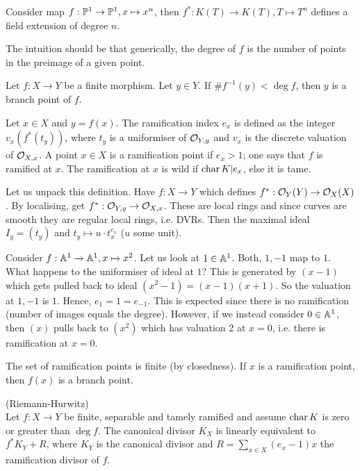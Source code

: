 \documentclass[a4paper,11pt]{article}
\begin{document}
			\begin{eg}
				Consider map $f:\P^1\rightarrow\P^1, x\mapsto x^n$, then $f^\ast:K(T)\rightarrow K(T),T\mapsto T^n$ defines a field extension of degree $n$. 
			\end{eg}

			The intuition should be that generically, the degree of $f$ is the number of points in the preimage of a given point. 

			\begin{defi}
				Let $f:X\rightarrow Y$ be a finite morphism. Let $y\in Y$. If $\#f^{-1}(y)<\deg f$, then $y$ is a branch point of $f$.
			\end{defi}

			\begin{defi}
				Let $x\in X$ and $y=f(x)$. The ramification index $e_x$ is defined as the integer $v_x(f^\ast(t_y))$, where $t_y$ is a uniformiser of $\O_{Y,y}$ and $v_x$ is the discrete valuation of $\O_{X,x}$. A point $x\in X$ is a ramification point if $e_x>1$; one says that $f$ is ramified at $x$. The ramification at $x$ is wild if $\Char K|e_x$, else it is tame.
			\end{defi}

			Let us unpack this definition. Have $f:X\rightarrow Y$ which defines $f^\ast:\O_Y(Y)\rightarrow\O_X(X)$. By localising, get $f^\ast:\O_{Y,y}\rightarrow\O_{X,x}$. These are local rings and since curves are smooth they are regular local rings, i.e. DVRs. Then the maximal ideal $I_y=(t_y)$ and $t_y\mapsto u\cdot t_x^{e_x}$ ($u$ some unit).

			\begin{eg}
				Consider $f:\AA^1\rightarrow\AA^1,x\mapsto x^2$. Let us look at $1\in\AA^1$. Both, $1,-1$ map to $1$. What happens to the uniformiser of ideal at $1$? This is generated by $(x-1)$ which gets pulled back to ideal $(x^2-1)=(x-1)(x+1)$. So the valuation at $1,-1$ is $1$. Hence, $e_1=1=e_{-1}$. This is expected since there is no ramification (number of images equals the degree). However, if we instead consider $0\in\AA^1$, then $(x)$ pulls back to $(x^2)$ which has valuation 2 at $x=0$, i.e. there is ramification at $x=0$.
			\end{eg}

			\begin{remark}
				The set of ramification points is finite (by closedness). If $x$ is a ramification point, then $f(x)$ is a branch point.
			\end{remark}

			\begin{thm}\label{thm--RiemannHurwitz}
				(Riemann-Hurwitz)\\ Let $f:X\rightarrow Y$ be finite, separable and tamely ramified and assume $\Char K$ is zero or greater than $\deg f$. The canonical divisor $K_X$ is linearly equivalent to $f^\ast K_Y+R$, where $K_Y$ is the canonical divisor and $R=\sum_{x\in X}(e_x-1)x$ the ramification divisor of $f$.
			\end{thm}
\end{document}
